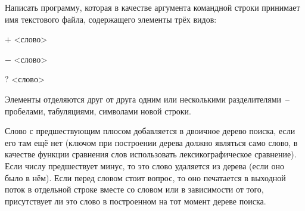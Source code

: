

Написать программу, которая в качестве аргумента командной строки
принимает имя текстового файла, содержащего элементы трёх видов:
\begin{description}
\item{$+$} <слово>
\item{$-$} <слово>
\item{$?$} <слово>
\end{description}

Элементы отделяются друг от друга одним или несколькими
разделителями~-- пробелами, табуляциями, символами новой строки.

Слово
с предшествующим плюсом добавляется в двоичное дерево поиска, если
его там ещё нет (ключом при построении дерева должно являться само
слово, в качестве функции сравнения слов использовать
лексикографическое сравнение). Если числу предшествует минус, то это
слово удаляется из дерева (если оно было в нём). Если перед словом стоит
вопрос, то оно печатается в выходной поток в отдельной строке вместе со
словом  или  в зависимости от того, присутствует ли это слово в
построенном на тот момент дереве поиска.
